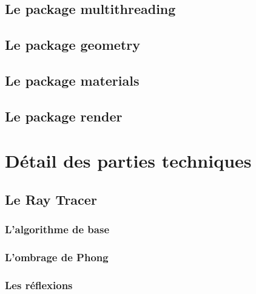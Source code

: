 \documentclass[11pt]{article}
\begin{document}
        \subsection{Le package multithreading}
	  

	\subsection{Le package geometry}
	    

        \subsection{Le package materials}
            

        \subsection{Le package render}
        	



\section{Détail des parties techniques}
    \subsection{Le Ray Tracer}
        \subsubsection{L'algorithme de base}
            \label{rayTracingBase}

            

        \subsubsection{L'ombrage de Phong}
            \label{ombragePhong}

            

        \subsubsection{Les réflexions}

            
\end{document}
